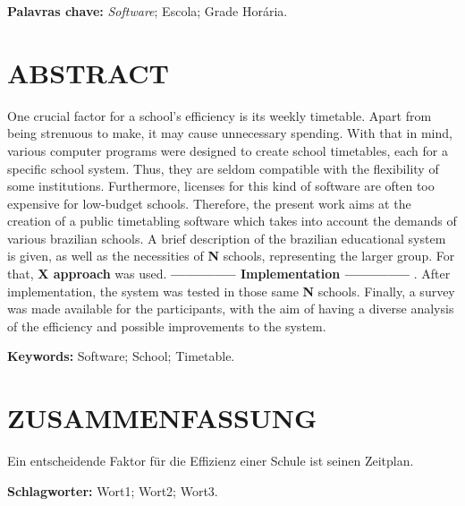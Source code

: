 \documentclass[12pt,a4paper]{article}
\begin{document}
	\begingroup
		\setlength{\parindent}{0mm}
		\textbf{Palavras chave:} \textit{Software}; Escola; Grade Horária.
	\endgroup
	\newpage


	\thispagestyle{empty}
	\section*{ABSTRACT}

	One crucial factor for a school's efficiency is its weekly timetable. Apart from being strenuous to make, it may cause unnecessary spending. With that in mind, various computer programs were designed to create school timetables, each for a specific school system. Thus, they are seldom compatible with the flexibility of some institutions. Furthermore, licenses for this kind of software are often too expensive for low-budget schools. Therefore, the present work aims at the creation of a public timetabling software which takes into account the demands of various brazilian schools. A brief description of the brazilian educational system is given, as well as the necessities of \textbf{N} schools, representing the larger group. For that, \textbf{X approach} was used.  \textbf{ -------------- Implementation -------------- }. After implementation, the system was tested in those same \textbf{N} schools. Finally, a survey was made available for the participants, with the aim of having a diverse analysis of the efficiency and possible improvements to the system.

	\begingroup
		\setlength{\parindent}{0mm}
		\textbf{Keywords:} Software; School; Timetable.
	\endgroup

	\newpage


	\thispagestyle{empty}
	\section*{ZUSAMMENFASSUNG}

	Ein entscheidende Faktor für die Effizienz einer Schule ist seinen Zeitplan. 

	\lipsum[1]


	\begingroup
		\setlength{\parindent}{0mm}
		\textbf{Schlagworter:} Wort1; Wort2; Wort3.
	\endgroup

	\newpage

	\thispagestyle{empty}
\end{document}
